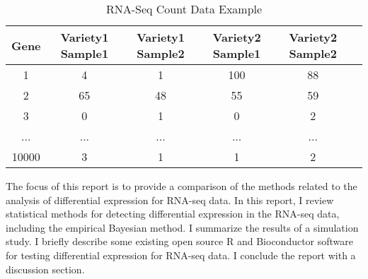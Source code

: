 \begin{table}[H]
\begin{center}
    \begin{tabular}{|c|c|c|c|c|c|}
      \hline
      Gene &Variety1 Sample1 &Variety1 Sample2 &Variety2 Sample1 & Variety2 Sample2 \\
      \hline
      1 & 4 & 1 & 100 & 88 \\
      \hline
      2 & 65 & 48 & 55 & 59 \\
      \hline
      3 & 0 & 1 & 0 & 2\\
      \hline
      ... & ... & ... & ... & ...\\
      \hline
       10000 & 3 & 1 & 1 & 2\\
       \hline
    \end{tabular}
\end{center}
\caption{RNA-Seq Count Data Example}
\label{tab:RNA-Seq Data}
\end{table}

The focus of this report is to provide a comparison of the methods related to the analysis of differential expression for RNA-seq data. In this report, I review statistical methods for detecting differential expression in the RNA-seq data, including the empirical Bayesian method. I summarize the results of a simulation study. I briefly describe some existing open source R and Bioconductor software for testing differential expression for RNA-seq data. I conclude the report with a discussion section. 

